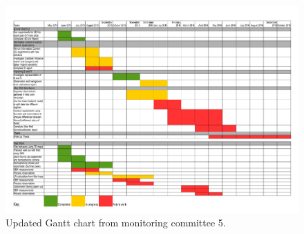 \documentclass[11pt]{article}
\begin{document}
\begin{figure}
    \includegraphics[width=1.\textwidth]{gantt_nov15.pdf}
    \caption{Updated Gantt chart from monitoring committee 5.}
    \label{fig:PropProf}
\end{figure}
\end{document}
